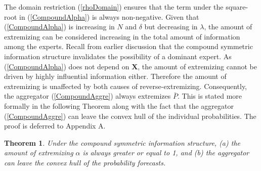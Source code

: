 \documentclass[11pt]{article}
\newtheorem{theorem}{Theorem}[section]
\theoremstyle{definition}
\theoremstyle{definition}
\begin{document}
The domain restriction (\ref{rhoDomain}) ensures that the term under the square-root in (\ref{CompoundAlpha}) is always non-negative.  
Given that (\ref{CompoundAlpha}) is increasing in $N$ and $\delta$ but decreasing in $\lambda$, the amount of extremizing can be considered increasing in the total amount of information among the experts. Recall from earlier discussion that the compound symmetric information structure invalidates the possibility of a dominant expert. As (\ref{CompoundAlpha}) does not depend on $\boldsymbol{X}$, the amount of extremizing cannot be driven by highly influential information either. Therefore the amount of extremizing is unaffected by both causes of reverse-extremizing. Consequently, the aggregator (\ref{CompoundAggre}) always extremizes $\bar{P}$.   This is stated more formally in the following Theorem along with the fact that the aggregator (\ref{CompoundAggre}) can leave the convex hull of the individual probabilities. The proof is deferred to Appendix A. 

\begin{theorem}
\label{positiveThm}
Under the compound symmetric information structure, (a) the amount of extremizing $\alpha$ is always greater or equal to 1, and (b) the aggregator can leave the convex hull of the probability forecasts. 
\end{theorem}
\end{document}
